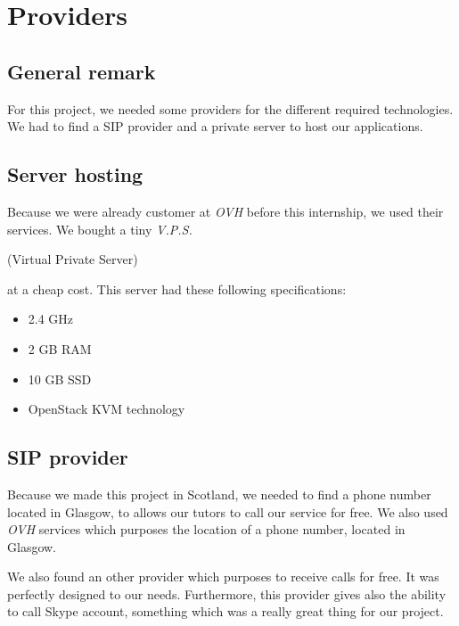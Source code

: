 \chapter{Providers}

\section{General remark}

For this project, we needed some providers for the different required technologies. We had to find a SIP provider and a private server to host our applications. 

\section{Server hosting}

Because we were already customer at \textit{OVH} before this internship, we used their services. We bought a tiny \textit{V.P.S.} \begin{tiny}(Virtual Private Server)\end{tiny} at a cheap cost. This server had these following specifications:
\begin{itemize}  
\item 2.4 GHz
\item 2 GB RAM
\item 10 GB SSD
\item OpenStack KVM technology
\end{itemize}



\section{SIP provider}

Because we made this project in Scotland, we needed to find a phone number located in Glasgow, to allows our tutors to call our service for free. We also used \textit{OVH} services which purposes the location of a phone number, located in Glasgow. 

We also found an other provider which purposes to receive calls for free. It was perfectly designed to our needs. Furthermore, this provider gives also the ability to call Skype account, something which was a really great thing for our project. 


\newpage